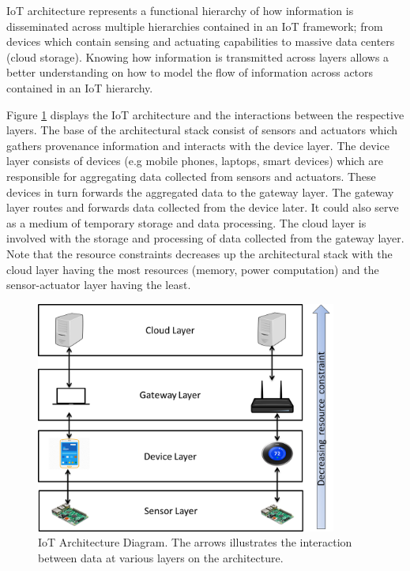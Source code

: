 IoT architecture represents a functional hierarchy of how information is disseminated across multiple hierarchies contained in an IoT framework; from devices which contain sensing and actuating capabilities to massive data centers (cloud storage). Knowing how information is transmitted across layers allows a better understanding on how to model the flow of information across actors contained in an IoT hierarchy. 
\par Figure \ref{iot_architecture} displays the IoT architecture and the interactions between the respective  layers. The base of the architectural stack consist of sensors and actuators which gathers provenance information and interacts with the device layer. The device layer consists of devices (e.g mobile phones, laptops, smart devices) which are responsible for aggregating data collected from sensors and actuators. These devices in turn forwards the aggregated data to the gateway layer. The gateway layer routes and forwards data collected from the device later. It could also serve as a medium of temporary storage and data processing. The cloud layer is involved with the storage and processing of data collected from the gateway layer. Note that the resource constraints decreases up the architectural stack with the cloud layer having the most resources (memory, power computation) and the sensor-actuator layer having the least. 


\begin{figure}[h]
\begin{center}

\includegraphics[height=3.0in]{iot_architecture.png}
\end{center}
\caption{IoT Architecture Diagram. The arrows illustrates the interaction between data at various layers on the architecture.}
\label{iot_architecture}

\end{figure}



